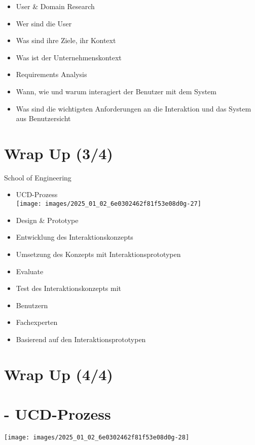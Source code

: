 \documentclass[10pt]{article}
\begin{document}
\begin{itemize}
  \item User \& Domain Research
  \item Wer sind die User
  \item Was sind ihre Ziele, ihr Kontext
  \item Was ist der Unternehmenskontext
  \item Requirements Analysis
  \item Wann, wie und warum interagiert der Benutzer mit dem System
  \item Was sind die wichtigsten Anforderungen an die Interaktion und das System aus Benutzersicht
\end{itemize}

\section*{Wrap Up (3/4)}
School of Engineering

\begin{itemize}
  \item UCD-Prozess\\
\texttt{[image: images/2025\_01\_02\_6e0302462f81f53e08d0g-27]}
  \item Design \& Prototype
  \item Entwicklung des Interaktionskonzepts
  \item Umsetzung des Konzepts mit Interaktionsprototypen
  \item Evaluate
  \item Test des Interaktionskonzepts mit
  \item Benutzern
  \item Fachexperten
  \item Basierend auf den Interaktionsprototypen
\end{itemize}

\section*{Wrap Up (4/4)}
\section*{- UCD-Prozess}
\begin{center}
\texttt{[image: images/2025\_01\_02\_6e0302462f81f53e08d0g-28]}
\end{center}
\end{document}

